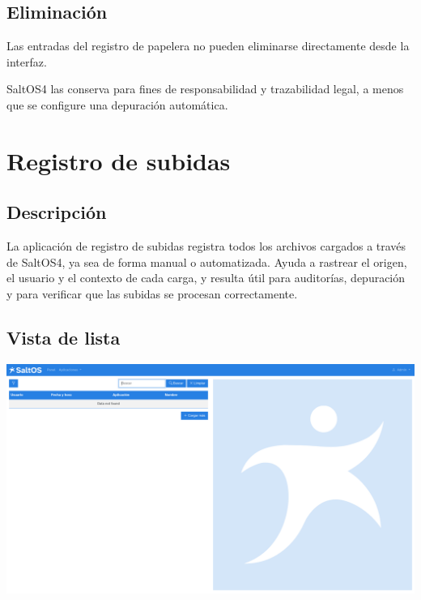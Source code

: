 \documentclass[a4paper]{article}
\begin{document}
\hypertarget{toc35}{}
\subsection{Eliminación}

Las entradas del registro de papelera no pueden eliminarse directamente desde la interfaz.

SaltOS4 las conserva para fines de responsabilidad y trazabilidad legal, a menos que se configure una depuración automática.


\hypertarget{toc36}{}
\section{Registro de subidas}

\hypertarget{toc37}{}
\subsection{Descripción}

La aplicación de registro de subidas registra todos los archivos cargados a través de SaltOS4, ya sea de forma manual o automatizada.
Ayuda a rastrear el origen, el usuario y el contexto de cada carga, y resulta útil para auditorías, depuración y para verificar que las subidas se procesan correctamente.

\hypertarget{toc38}{}
\subsection{Vista de lista}

\begin{center}\includegraphics[width=1\textwidth]{../ujest/snaps/test-screenshots-js-screenshots-common-uploadlog-list-es-es-1-snap.png}\end{center}
\end{document}
